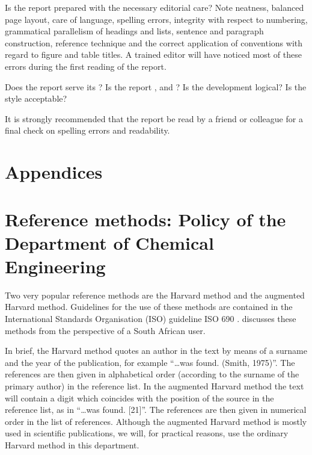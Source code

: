 \documentclass[a5paper, 10pt]{article}
\begin{document}
Is the report prepared with the necessary editorial care?  Note
neatness, balanced page layout, care of language, spelling errors,
integrity with respect to numbering, grammatical parallelism of
headings and lists, sentence and paragraph construction, reference
technique and the correct application of conventions with regard to
figure and table titles.  A trained editor will have noticed most of
these errors during the first reading of the report.

Does the report serve its ?  Is the report
,  and ?  Is
the development logical?  Is the style acceptable?

It is strongly recommended that the report be read by a friend or
colleague for a final check on spelling errors and readability.




\section{Appendices}
\appendix
\makeatletter
\def\@seccntformat#1{\csname Pref@#1\endcsname \csname the#1\endcsname\quad}
\def\Pref@section{Appendix~}
\makeatother

\section[Reference Methods: Policy of the Department of \\Chemical Engineering]{Reference methods: Policy of the \\Department of Chemical Engineering}
\label{app:reference_methods}
Two very popular reference methods are the Harvard method and the
augmented Harvard method.  Guidelines for the use of these methods are
contained in the International Standards Organisation (ISO) guideline
ISO 690 \citep{ISO690}.  \citet{burger} discusses these methods from
the perspective of a South African user.

In brief, the Harvard method quotes an author in the text by means of
a surname and the year of the publication, for example ``\dots was found.
(Smith, 1975)''.  The references are then given in alphabetical order
(according to the surname of the primary author) in the reference
list.  In the augmented Harvard method the text will contain a digit
which coincides with the position of the source in the reference list,
as in ``\dots was found.  [21]''.  The references are then given in
numerical order in the list of references.  Although the augmented
Harvard method is mostly used in scientific publications, we will, for
practical reasons, use the ordinary Harvard method in this department.
\end{document}

